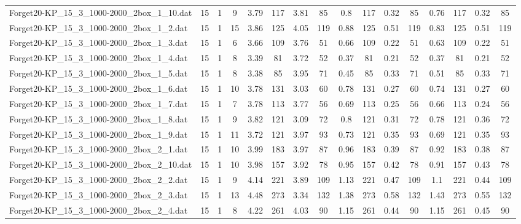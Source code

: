 \begin{sidewaystable}[!ht]
{\begin{tabular}{lccccccccccccccc}
Forget20-KP\_15\_3\_1000-2000\_2box\_1\_10.dat & 15 & 1 & 9 & 3.79 & 117 & 3.81 & 85 & 0.8 & 117 &  \textcolor{blue2}{0.32} & 85 & 0.76 & 117 &  \textcolor{blue2}{0.32} & 85 \\
Forget20-KP\_15\_3\_1000-2000\_2box\_1\_2.dat & 15 & 1 & 15 & 3.86 & 125 & 4.05 & 119 & 0.88 & 125 & 0.51 & 119 & 0.83 & 125 & 0.51 & 119 \\
Forget20-KP\_15\_3\_1000-2000\_2box\_1\_3.dat & 15 & 1 & 6 & 3.66 & 109 & 3.76 & 51 & 0.66 & 109 &  \textcolor{blue2}{0.22} & 51 & 0.63 & 109 &  \textcolor{blue2}{0.22} & 51 \\
Forget20-KP\_15\_3\_1000-2000\_2box\_1\_4.dat & 15 & 1 & 8 & 3.39 & 81 & 3.72 & 52 & 0.37 & 81 &  \textcolor{blue2}{0.21} & 52 & 0.37 & 81 &  \textcolor{blue2}{0.21} & 52 \\
Forget20-KP\_15\_3\_1000-2000\_2box\_1\_5.dat & 15 & 1 & 8 & 3.38 & 85 & 3.95 & 71 & 0.45 & 85 & 0.33 & 71 & 0.51 & 85 & 0.33 & 71 \\
Forget20-KP\_15\_3\_1000-2000\_2box\_1\_6.dat & 15 & 1 & 10 & 3.78 & 131 & 3.03 & 60 & 0.78 & 131 &  \textcolor{blue2}{0.27} & 60 & 0.74 & 131 &  \textcolor{blue2}{0.27} & 60 \\
Forget20-KP\_15\_3\_1000-2000\_2box\_1\_7.dat & 15 & 1 & 7 & 3.78 & 113 & 3.77 & 56 & 0.69 & 113 & 0.25 & 56 & 0.66 & 113 &  \textcolor{blue2}{0.24} & 56 \\
Forget20-KP\_15\_3\_1000-2000\_2box\_1\_8.dat & 15 & 1 & 9 & 3.82 & 121 & 3.09 & 72 & 0.8 & 121 & 0.31 & 72 & 0.78 & 121 & 0.36 & 72 \\
Forget20-KP\_15\_3\_1000-2000\_2box\_1\_9.dat & 15 & 1 & 11 & 3.72 & 121 & 3.97 & 93 & 0.73 & 121 &  \textcolor{blue2}{0.35} & 93 & 0.69 & 121 &  \textcolor{blue2}{0.35} & 93 \\
Forget20-KP\_15\_3\_1000-2000\_2box\_2\_1.dat & 15 & 1 & 10 & 3.99 & 183 & 3.97 & 87 & 0.96 & 183 & 0.39 & 87 & 0.92 & 183 &  \textcolor{blue2}{0.38} & 87 \\
Forget20-KP\_15\_3\_1000-2000\_2box\_2\_10.dat & 15 & 1 & 10 & 3.98 & 157 & 3.92 & 78 & 0.95 & 157 &  \textcolor{blue2}{0.42} & 78 & 0.91 & 157 & 0.43 & 78 \\
Forget20-KP\_15\_3\_1000-2000\_2box\_2\_2.dat & 15 & 1 & 9 & 4.14 & 221 & 3.89 & 109 & 1.13 & 221 & 0.47 & 109 & 1.1 & 221 &  \textcolor{blue2}{0.44} & 109 \\
Forget20-KP\_15\_3\_1000-2000\_2box\_2\_3.dat & 15 & 1 & 13 & 4.48 & 273 & 3.34 & 132 & 1.38 & 273 & 0.58 & 132 & 1.43 & 273 & 0.55 & 132 \\
Forget20-KP\_15\_3\_1000-2000\_2box\_2\_4.dat & 15 & 1 & 8 & 4.22 & 261 & 4.03 & 90 & 1.15 & 261 &  \textcolor{blue2}{0.44} & 90 & 1.15 & 261 & 0.45 & 90 \\

\end{tabular}}
\end{sidewaystable}
